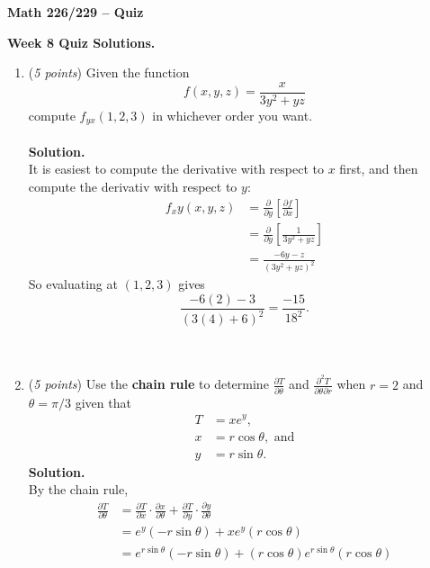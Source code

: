 \documentclass[12 pt]{article}
\begin{document}
	\begin{center}
		\textbf{\hfill Math 226/229 -- Quiz} \\
	\end{center}
	\medskip

	\noindent
	\textbf{Week 8 Quiz Solutions.} \hfill
	\vspace{.1in}
	\hspace*{0.2in}
	\medskip
	\noindent
  \begin{enumerate}
		\item (\textit{5 points})
		Given the function \[
			f(x, y, z) = \frac{x}{3y^2 + yz}
		\] compute $f_{yx} (1, 2, 3)$ in whichever order you want.
    \\~\\
    \textbf{Solution.}
    \\
		It is easiest to compute the derivative with respect to $x$ first,
		and then compute the derivativ with respect to $y$: \begin{align*}
		f_xy(x, y, z) &= \frac{\partial}{\partial y}\left[
			\frac{\partial f}{\partial x}
		\right] \\
		&= \frac{\partial}{\partial y}\left[
			\frac{1}{3y^2 + yz}
		\right] \\
		&= \frac{-6y - z}{(3y^2 + yz)^2}
		\end{align*}
		So evaluating at $(1, 2, 3)$ gives \[
			\frac{-6(2) - 3}{(3(4) + 6)^2} = \frac{-15}{18^2}.
		\]
		\\~\\
		\item (\textit{5 points})
		Use the \textbf{chain rule} to determine
		$\displaystyle \frac{\partial T}{\partial \theta}$ and
		$\displaystyle \frac{\partial^2 T}{\partial \theta \partial r}$
		when $r = 2$ and $\theta = \pi/3$
		given that \begin{align*}
			T &= xe^y, \\
			x &= r\cos\theta, \text{ and}\\
			y &= r\sin\theta.
		\end{align*}
    \textbf{Solution.}
		\\
		By the chain rule, \begin{align*}
			\frac{\partial T}{\partial \theta}
			&= \frac{\partial T}{\partial x}\cdot\frac{\partial x}{\partial \theta}
			+ \frac{\partial T}{\partial y}\cdot\frac{\partial y}{\partial \theta}\\
			&= e^y(-r \sin\theta) + xe^y(r\cos\theta) \\
			&= e^{r \sin\theta}(-r \sin\theta) + (r\cos\theta)e^{r\sin\theta}(r\cos\theta) \\

\end{align*}
\end{enumerate}
\end{document}
